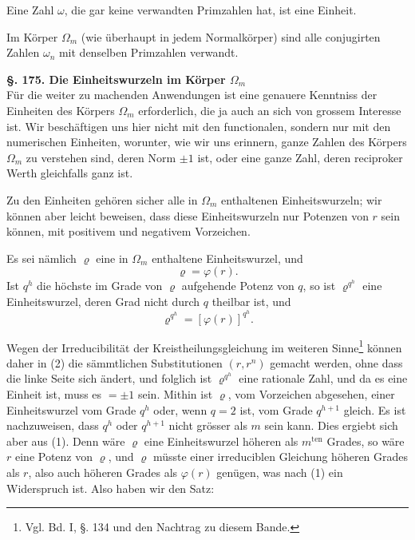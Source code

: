 \documentclass[12pt,a4paper]{article}
\begin{document}
Eine Zahl $\omega$, die gar keine verwandten Primzahlen hat, ist eine Einheit.

Im Körper $\Omega_m$ (wie überhaupt in jedem Normalkörper) sind alle conjugirten Zahlen $\omega_n$ mit denselben Primzahlen verwandt.

\bigskip\noindent\textbf{\S. 175. Die Einheitswurzeln im Körper $\Omega_m$}\\[4pt]

Für die weiter zu machenden Anwendungen ist eine genauere Kenntniss der Einheiten des Körpers $\Omega_m$ erforderlich, die ja auch an sich von grossem Interesse ist. Wir beschäftigen uns hier nicht mit den functionalen, sondern nur mit den numerischen Einheiten, worunter, wie wir uns erinnern, ganze Zahlen des Körpers $\Omega_m$ zu verstehen sind, deren Norm $\pm 1$ ist, oder eine ganze Zahl, deren reciproker Werth gleichfalls ganz ist.

Zu den Einheiten gehören sicher alle in $\Omega_m$ enthaltenen Einheitswurzeln; wir können aber leicht beweisen, dass diese Einheitswurzeln nur Potenzen von $r$ sein können, mit positivem und negativem Vorzeichen.

Es sei nämlich $\varrho$ eine in $\Omega_m$ enthaltene Einheitswurzel, und
\begin{equation}\label{eq:175-1}
\varrho = \varphi(r).
\end{equation}
Ist $q^h$ die höchste im Grade von $\varrho$ aufgehende Potenz von $q$, so ist $\varrho^{q^h}$ eine Einheitswurzel, deren Grad nicht durch $q$ theilbar ist, und
\begin{equation}\label{eq:175-2}
\varrho^{q^h} = [\varphi(r)]^{q^h}.
\end{equation}

Wegen der Irreducibilität der Kreistheilungsgleichung im weiteren Sinne\footnote{Vgl. Bd. I, \S. 134 und den Nachtrag zu diesem Bande.} können daher in (2) die sämmtlichen Substitutionen $(r, r^n)$ gemacht werden, ohne dass die linke Seite sich ändert, und folglich ist $\varrho^{q^h}$ eine rationale Zahl, und da es eine Einheit ist, muss es $= \pm 1$ sein. Mithin ist $\varrho$, vom Vorzeichen abgesehen, einer Einheitswurzel vom Grade $q^h$ oder, wenn $q = 2$ ist, vom Grade $q^{h+1}$ gleich. Es ist nachzuweisen, dass $q^h$ oder $q^{h+1}$ nicht grösser als $m$ sein kann. Dies ergiebt sich aber aus (1). Denn wäre $\varrho$ eine Einheitswurzel höheren als $m^{\text{ten}}$ Grades, so wäre $r$ eine Potenz von $\varrho$, und $\varrho$ müsste einer irreduciblen Gleichung höheren Grades als $r$, also auch höheren Grades als $\varphi(r)$ genügen, was nach (1) ein Widerspruch ist. Also haben wir den Satz:
\end{document}

